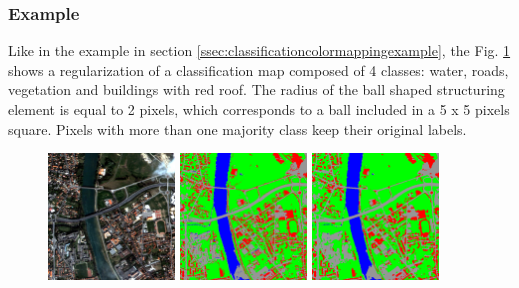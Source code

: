 \subsubsection{Example}
Like in the example in section \ref{ssec:classificationcolormappingexample}, the Fig. \ref{fig:ClassificationMapRegularizationApplication}
shows a regularization of a classification map composed of 4 classes: water, roads, vegetation and buildings with red roof. The radius of
the ball shaped structuring element is equal to 2 pixels, which corresponds to a ball included in a 5 x 5 pixels square. Pixels with
more than one majority class keep their original labels.


\begin{figure}[!h]
  \center
  \includegraphics[width=0.3\textwidth]{../Art/MonteverdiImages/classification_chain_inputimage.jpg}
  \includegraphics[width=0.3\textwidth]{../Art/MonteverdiImages/classification_chain_fancyclassif_CMR_input.png}
  \includegraphics[width=0.3\textwidth]{../Art/MonteverdiImages/classification_chain_fancyclassif_CMR_2.png}
  \label{fig:ClassificationMapRegularizationApplication}
\end{figure}




